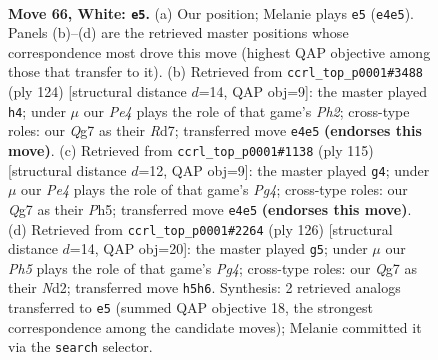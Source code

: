 \documentclass[11pt]{article}
\begin{document}
\clearpage

\begin{figure}[p]\centering
\begin{subfigure}{0.46\textwidth}\centering
\resizebox{\linewidth}{!}{%
\newchessgame
\chessboard[
  setfen={8/6Q1/2k3P1/7P/1r2P3/8/2K5/8 w - - 1 66},
  showmover=false,
  pgfstyle=straightmove, color=movearrow, markmove={e4-e5}
]}
\caption{}
\end{subfigure}\hfill
\begin{subfigure}{0.46\textwidth}\centering
\resizebox{\linewidth}{!}{%
\newchessgame
\chessboard[
  setfen={6k1/3R4/7p/8/6K1/6P1/1r5P/8 w - - 6 63},
  showmover=false,
  pgfstyle=straightmove, color=movearrow, markmove={h2-h4}
]}
\caption{}
\end{subfigure}
\\[4pt]
\begin{subfigure}{0.46\textwidth}\centering
\resizebox{\linewidth}{!}{%
\newchessgame
\chessboard[
  setfen={8/8/8/R5pp/5p2/6k1/8/4K3 b - - 1 58},
  showmover=false,
  pgfstyle=straightmove, color=movearrow, markmove={g5-g4}
]}
\caption{}
\end{subfigure}\hfill
\begin{subfigure}{0.46\textwidth}\centering
\resizebox{\linewidth}{!}{%
\newchessgame
\chessboard[
  setfen={6k1/2r5/7K/7P/2P3P1/8/3N4/8 w - - 7 64},
  showmover=false,
  pgfstyle=straightmove, color=movearrow, markmove={g4-g5}
]}
\caption{}
\end{subfigure}
\caption{\textbf{Move 66, White: \texttt{e5}.} (a) Our position; Melanie plays \texttt{e5} (\texttt{e4e5}). Panels (b)--(d) are the retrieved master positions whose correspondence most drove this move (highest QAP objective among those that transfer to it). (b) Retrieved from \texttt{ccrl\_top\_p0001\#3488} (ply 124) [structural distance $d$=14, QAP obj=9]: the master played \texttt{h4}; under $\mu$ our \emph{Pe4} plays the role of that game's \emph{Ph2}; cross-type roles: our \emph{Q}g7 as their \emph{R}d7; transferred move \texttt{e4e5} \textbf{(endorses this move)}. (c) Retrieved from \texttt{ccrl\_top\_p0001\#1138} (ply 115) [structural distance $d$=12, QAP obj=9]: the master played \texttt{g4}; under $\mu$ our \emph{Pe4} plays the role of that game's \emph{Pg4}; cross-type roles: our \emph{Q}g7 as their \emph{P}h5; transferred move \texttt{e4e5} \textbf{(endorses this move)}. (d) Retrieved from \texttt{ccrl\_top\_p0001\#2264} (ply 126) [structural distance $d$=14, QAP obj=20]: the master played \texttt{g5}; under $\mu$ our \emph{Ph5} plays the role of that game's \emph{Pg4}; cross-type roles: our \emph{Q}g7 as their \emph{N}d2; transferred move \texttt{h5h6}. Synthesis: 2 retrieved analogs transferred to \texttt{e5} (summed QAP objective 18, the strongest correspondence among the candidate moves); Melanie committed it via the \texttt{search} selector.}
\label{fig:thought-m130}
\end{figure}
\end{document}
